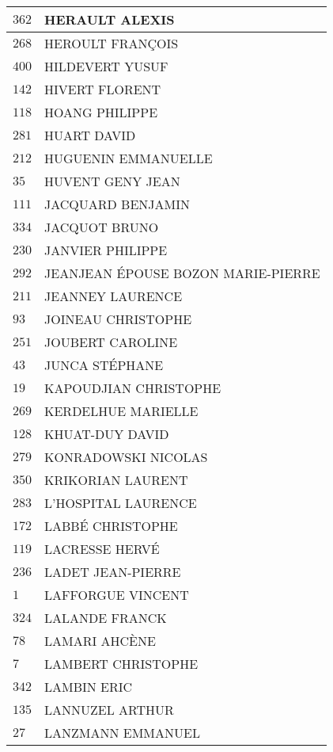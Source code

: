 \begin{xltabular}{\linewidth}{|l|X|}
    \hline
    $362$ & HERAULT ALEXIS \\
    \hline
    $268$ & HEROULT FRANÇOIS \\
    \hline
    $400$ & HILDEVERT YUSUF \\
    \hline
    $142$ & HIVERT FLORENT \\
    \hline
    $118$ & HOANG PHILIPPE \\
    \hline
    $281$ & HUART DAVID \\
    \hline
    $212$ & HUGUENIN EMMANUELLE \\
    \hline
    $35$ & HUVENT GENY JEAN \\
    \hline
    $111$ & JACQUARD BENJAMIN \\
    \hline
    $334$ & JACQUOT BRUNO \\
    \hline
    $230$ & JANVIER PHILIPPE \\
    \hline
    $292$ & JEANJEAN ÉPOUSE BOZON MARIE-PIERRE \\
    \hline
    $211$ & JEANNEY LAURENCE \\
    \hline
    $93$ & JOINEAU CHRISTOPHE \\
    \hline
    $251$ & JOUBERT CAROLINE \\
    \hline
    $43$ & JUNCA STÉPHANE \\
    \hline
    $19$ & KAPOUDJIAN CHRISTOPHE \\
    \hline
    $269$ & KERDELHUE MARIELLE \\
    \hline
    $128$ & KHUAT-DUY DAVID \\
    \hline
    $279$ & KONRADOWSKI NICOLAS \\
    \hline
    $350$ & KRIKORIAN LAURENT \\
    \hline
    $283$ & L'HOSPITAL LAURENCE \\
    \hline
    $172$ & LABBÉ CHRISTOPHE \\
    \hline
    $119$ & LACRESSE HERVÉ \\
    \hline
    $236$ & LADET JEAN-PIERRE \\
    \hline
    $1$ & LAFFORGUE VINCENT \\
    \hline
    $324$ & LALANDE FRANCK \\
    \hline
    $78$ & LAMARI AHCÈNE \\
    \hline
    $7$ & LAMBERT CHRISTOPHE \\
    \hline
    $342$ & LAMBIN ERIC \\
    \hline
    $135$ & LANNUZEL ARTHUR \\
    \hline
    $27$ & LANZMANN EMMANUEL \\

\end{xltabular}
